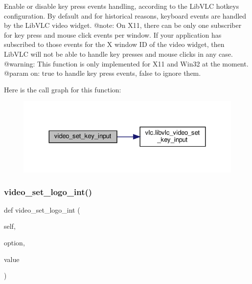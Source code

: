 \begin{DoxyVerb}Enable or disable key press events handling, according to the LibVLC hotkeys
configuration. By default and for historical reasons, keyboard events are
handled by the LibVLC video widget.
@note: On X11, there can be only one subscriber for key press and mouse
click events per window. If your application has subscribed to those events
for the X window ID of the video widget, then LibVLC will not be able to
handle key presses and mouse clicks in any case.
@warning: This function is only implemented for X11 and Win32 at the moment.
@param on: true to handle key press events, false to ignore them.
\end{DoxyVerb}
 Here is the call graph for this function\+:
\nopagebreak
\begin{figure}[H]
\begin{center}
\leavevmode
\includegraphics[width=324pt]{classvlc_1_1_media_player_a1b21501a721f11e1adb9009442093707_cgraph}
\end{center}
\end{figure}
\mbox{\label{classvlc_1_1_media_player_a869914b4d2104458d72b18ec78f08527}} 
\subsubsection{\texorpdfstring{video\+\_\+set\+\_\+logo\+\_\+int()}{video\_set\_logo\_int()}}
{\footnotesize\ttfamily def video\+\_\+set\+\_\+logo\+\_\+int (\begin{DoxyParamCaption}\item[{}]{self,  }\item[{}]{option,  }\item[{}]{value }\end{DoxyParamCaption})}

